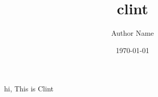 \documentclass{article}
\title{clint}
\author{Author Name}
\date{\today}
\begin{document}
\maketitle

hi, This is Clint
\end{document}
